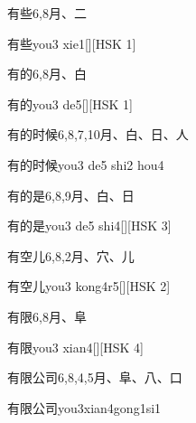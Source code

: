 \begin{entry}{有些}{6,8}{⽉、⼆}
  \begin{phonetics}{有些}{you3 xie1}[][HSK 1]
  \end{phonetics}
\end{entry}

\begin{entry}{有的}{6,8}{⽉、⽩}
  \begin{phonetics}{有的}{you3 de5}[][HSK 1]
  \end{phonetics}
\end{entry}

\begin{entry}{有的时候}{6,8,7,10}{⽉、⽩、⽇、⼈}
  \begin{phonetics}{有的时候}{you3 de5 shi2 hou4}
  \end{phonetics}
\end{entry}

\begin{entry}{有的是}{6,8,9}{⽉、⽩、⽇}
  \begin{phonetics}{有的是}{you3 de5 shi4}[][HSK 3]
  \end{phonetics}
\end{entry}

\begin{entry}{有空儿}{6,8,2}{⽉、⽳、⼉}
  \begin{phonetics}{有空儿}{you3 kong4r5}[][HSK 2]
  \end{phonetics}
\end{entry}

\begin{entry}{有限}{6,8}{⽉、⾩}
  \begin{phonetics}{有限}{you3 xian4}[][HSK 4]
  \end{phonetics}
\end{entry}

\begin{entry}{有限公司}{6,8,4,5}{⽉、⾩、⼋、⼝}
  \begin{phonetics}{有限公司}{you3xian4gong1si1}
  \end{phonetics}
\end{entry}

